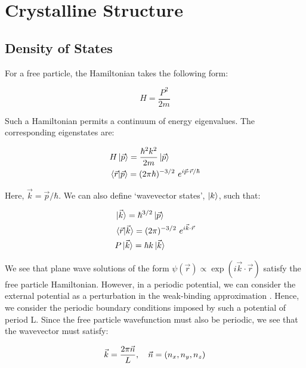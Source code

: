 \documentclass[]{article}
\begin{document}
\appendix
\section{Crystalline Structure}

\subsection{Density of States}\label{sec: DOS}

For a free particle, the Hamiltonian takes the following form:

\begin{equation}
	H = \frac{P^2}{2m}
\end{equation}

Such a Hamiltonian permits a continuum of energy eigenvalues. The corresponding eigenstates are:

\begin{align}
	&H\ket{\vec{p}} = \frac{\hbar^2 k^2}{2m}\ket{\vec{p}}\\
	&\braket{\vec{r} | \vec{p}} = (2\pi \hbar)^{-3/2}  \ e^{i\vec{p}\cdot\vec{r}/\hbar}
\end{align}

Here, $\vec{k} = \vec{p}/\hbar$. We can also define `wavevector states', $\ket{k}$, such that:

\begin{align}
&\ket{\vec{k}} = \hbar^{3/2}\ket{\vec{p}}\\
&\braket{\vec{r} | \vec{k}} = (2\pi)^{-3/2}  \ e^{i\vec{k}\cdot\vec{r}}\\
&P\ket{\vec{k}} = \hbar k \ket{\vec{k}}
\end{align}

We see that plane wave solutions  of the form $\psi(\vec{r}) \propto \exp(i\vec{k}\cdot\vec{r})$ satisfy the free particle Hamiltonian. However, in a periodic potential, we can consider the external potential as a perturbation in the weak-binding approximation \cite{Kittel_SolidStatePhysics}. Hence, we consider the periodic boundary conditions imposed by such a potential of period L. Since the free particle wavefunction must also be periodic, we see that the wavevector must satisfy:

\begin{equation}
	\centering
	\vec{k} = \frac{2\pi \vec{n}}{L},  \ \ \ \vec{n} = (n_x, n_y, n_z)
\end{equation}
\end{document}
